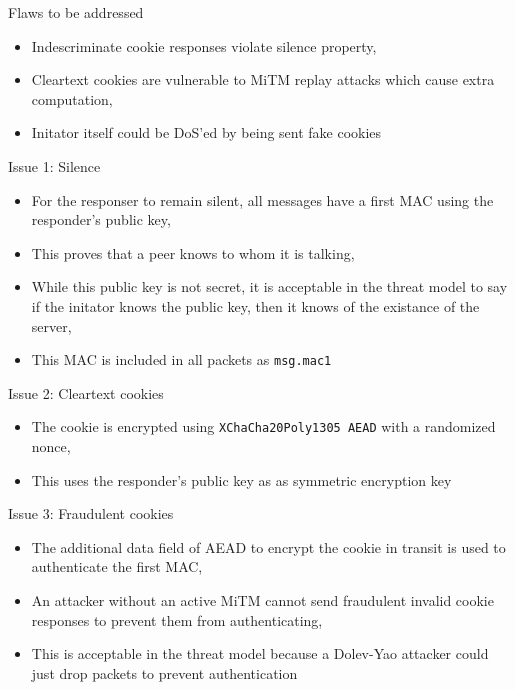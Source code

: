 \documentclass[xcolor=table]{beamer}
\begin{document}
    \begin{frame}{Flaws to be addressed}
        \begin{itemize}
            \item Indescriminate cookie responses violate silence property,
            \item Cleartext cookies are vulnerable to MiTM replay attacks which cause extra computation,
            \item Initator itself could be DoS'ed by being sent fake cookies
        \end{itemize}
    \end{frame}

    \begin{frame}{Issue 1: Silence}
        \begin{itemize}
            \item For the responser to remain silent, all messages have a first MAC using the responder's public key,
            \item This proves that a peer knows to whom it is talking,
            \item While this public key is not secret, it is acceptable in the threat model to say if the initator knows the public key, then it knows of the existance of the server,
            \item This MAC is included in all packets as \texttt{msg.mac1}
        \end{itemize}
    \end{frame}

    \begin{frame}{Issue 2: Cleartext cookies}
    \begin{itemize}
        \item The cookie is encrypted using \texttt{XChaCha20Poly1305 AEAD} with a randomized nonce,
        \item This uses the responder's public key as as symmetric encryption key
    \end{itemize}
    \end{frame}

    \begin{frame}{Issue 3: Fraudulent cookies}
    \begin{itemize}
        \item The additional data field of AEAD to encrypt the cookie in transit is used to authenticate the first MAC,
        \item An attacker without an active MiTM cannot send fraudulent invalid cookie responses to prevent them from authenticating,
        \item This is acceptable in the threat model because a Dolev-Yao attacker could just drop packets to prevent authentication
    \end{itemize}
    \end{frame}
\end{document}
